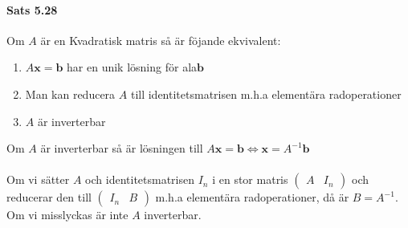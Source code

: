 \paragraph{Sats 5.28} Om $A$ är en Kvadratisk matris så är föjande ekvivalent:
\begin{enumerate}
    \item $A\bm{x}=\bm{b}$ har en unik lösning för ala$\bm{b}$
    \item Man kan reducera $A$ till identitetsmatrisen m.h.a elementära radoperationer
    \item $A$ är inverterbar
\end{enumerate}
Om $A$ är inverterbar så är lösningen till $A\bm{x}=\bm{b}\Leftrightarrow \bm{x}=A^{-1}\bm{b}$\\
~\\
Om vi sätter $A$ och identitetsmatrisen $I_{n}$ i en stor matris $\begin{pmatrix}A&I_{n}\end{pmatrix}$ och 
reducerar den till $\begin{pmatrix}I_{n}&B\end{pmatrix}$ m.h.a elementära radoperationer, då är $B=A^{-1}$.\\
Om vi misslyckas är inte $A$ inverterbar.

